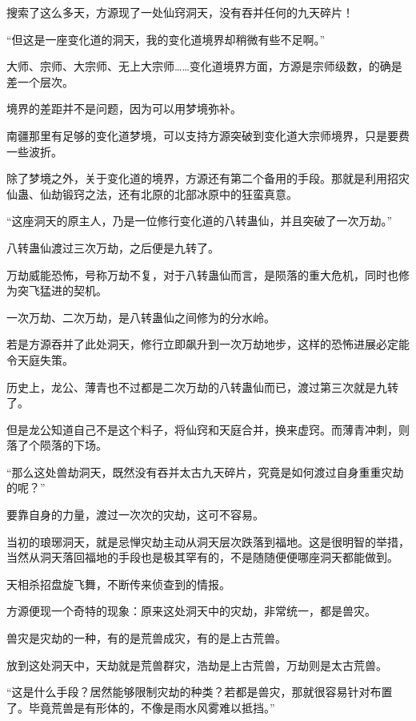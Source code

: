
\begin{this_body}



搜索了这么多天，方源现了一处仙窍洞天，没有吞并任何的九天碎片！

“但这是一座变化道的洞天，我的变化道境界却稍微有些不足啊。”

大师、宗师、大宗师、无上大宗师……变化道境界方面，方源是宗师级数，的确是差一个层次。

境界的差距并不是问题，因为可以用梦境弥补。

南疆那里有足够的变化道梦境，可以支持方源突破到变化道大宗师境界，只是要费一些波折。

除了梦境之外，关于变化道的境界，方源还有第二个备用的手段。那就是利用招灾仙蛊、仙劫锻窍之法，还有北原的北部冰原中的狂蛮真意。

“这座洞天的原主人，乃是一位修行变化道的八转蛊仙，并且突破了一次万劫。”

八转蛊仙渡过三次万劫，之后便是九转了。

万劫威能恐怖，号称万劫不复，对于八转蛊仙而言，是陨落的重大危机，同时也修为突飞猛进的契机。

一次万劫、二次万劫，是八转蛊仙之间修为的分水岭。

若是方源吞并了此处洞天，修行立即飙升到一次万劫地步，这样的恐怖进展必定能令天庭失策。

历史上，龙公、薄青也不过都是二次万劫的八转蛊仙而已，渡过第三次就是九转了。

但是龙公知道自己不是这个料子，将仙窍和天庭合并，换来虚窍。而薄青冲刺，则落了个陨落的下场。

“那么这处兽劫洞天，既然没有吞并太古九天碎片，究竟是如何渡过自身重重灾劫的呢？”

要靠自身的力量，渡过一次次的灾劫，这可不容易。

当初的琅琊洞天，就是忌惮灾劫主动从洞天层次跌落到福地。这是很明智的举措，当然从洞天落回福地的手段也是极其罕有的，不是随随便便哪座洞天都能做到。

天相杀招盘旋飞舞，不断传来侦查到的情报。

方源便现一个奇特的现象：原来这处洞天中的灾劫，非常统一，都是兽灾。

兽灾是灾劫的一种，有的是荒兽成灾，有的是上古荒兽。

放到这处洞天中，天劫就是荒兽群灾，浩劫是上古荒兽，万劫则是太古荒兽。

“这是什么手段？居然能够限制灾劫的种类？若都是兽灾，那就很容易针对布置了。毕竟荒兽是有形体的，不像是雨水风雾难以抵挡。”


\end{this_body}
